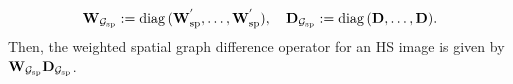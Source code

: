 \begin{equation}
	\label{eq:ExtentionSpatialGraphMat}
	\mathbf{W}_{\mathcal{G}_{\text{sp}}} := \operatorname{diag}{(\mathbf{W}_{\text{sp}}^{'}, \dots, \mathbf{W}_{\text{sp}}^{'})}, \quad
	\mathbf{D}_{\mathcal{G}_{\text{sp}}} := \operatorname{diag}{(\mathbf{D}, \dots, \mathbf{D})}.
\end{equation}
Then, the weighted spatial graph difference operator for an HS image is given by $\mathbf{W}_{\mathcal{G}_{\text{sp}}} \mathbf{D}_{\mathcal{G}_{\text{sp}}}$.

